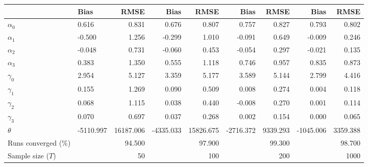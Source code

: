 
\begin{tabular}[t]{llrrrrrrr}
\toprule
  & Bias & RMSE & Bias & RMSE & Bias & RMSE & Bias & RMSE\\
\midrule
$\alpha_{0}$ & 0.616 & 0.831 & 0.676 & 0.807 & 0.757 & 0.827 & 0.793 & 0.802\\
$\alpha_{1}$ & -0.500 & 1.256 & -0.299 & 1.010 & -0.091 & 0.649 & -0.009 & 0.246\\
$\alpha_{2}$ & -0.048 & 0.731 & -0.060 & 0.453 & -0.054 & 0.297 & -0.021 & 0.135\\
$\alpha_{3}$ & 0.383 & 1.350 & 0.555 & 1.118 & 0.746 & 0.957 & 0.835 & 0.873\\
$\gamma_{0}$ & 2.954 & 5.127 & 3.359 & 5.177 & 3.589 & 5.144 & 2.799 & 4.416\\
$\gamma_{1}$ & 0.155 & 1.269 & 0.090 & 0.509 & 0.008 & 0.274 & 0.004 & 0.118\\
$\gamma_{2}$ & 0.068 & 1.115 & 0.038 & 0.440 & -0.008 & 0.270 & 0.001 & 0.114\\
$\gamma_{3}$ & 0.070 & 0.697 & 0.037 & 0.268 & 0.002 & 0.154 & 0.000 & 0.065\\
$\theta$ & -5110.997 & 16187.006 & -4335.033 & 15826.675 & -2716.372 & 9339.293 & -1045.006 & 3359.388\\
Runs converged (\%) &  & 94.500 &  & 97.900 &  & 99.300 &  & 98.700\\
Sample size ($T$) &  & 50 &  & 100 &  & 200 &  & 1000\\
\bottomrule
\end{tabular}
